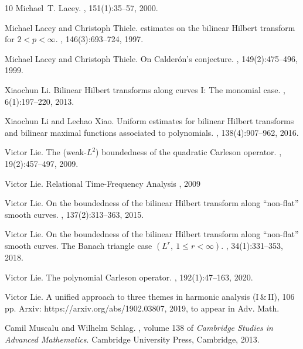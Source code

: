 \documentclass[a4paper,reqno]{amsart}
\numberwithin{equation}{section}
\theoremstyle{definition}
\begin{document}
\begin{thebibliography}{10}
Michael~T. Lacey.
, 151(1):35--57, 2000.

Michael Lacey and Christoph Thiele.
 estimates on the bilinear {H}ilbert transform for
  {$2<p<\infty$}.
, 146(3):693--724, 1997.

Michael Lacey and Christoph Thiele.
\newblock On {C}alder\'{o}n's conjecture.
, 149(2):475--496, 1999.

Xiaochun Li.
\newblock Bilinear {H}ilbert transforms along curves {I}: {T}he monomial case.
, 6(1):197--220, 2013.

Xiaochun Li and Lechao Xiao.
\newblock Uniform estimates for bilinear {H}ilbert transforms and bilinear
  maximal functions associated to polynomials.
, 138(4):907--962, 2016.

Victor Lie.
\newblock The (weak-{$L^2$}) boundedness of the quadratic {C}arleson operator.
, 19(2):457--497, 2009.

Victor Lie.
\newblock Relational Time-Frequency Analysis
, 2009

Victor Lie.
\newblock On the boundedness of the bilinear {H}ilbert transform along
  ``non-flat'' smooth curves.
, 137(2):313--363, 2015.

Victor Lie.
\newblock On the boundedness of the bilinear {H}ilbert transform along
  ``non-flat'' smooth curves. {T}he {B}anach triangle case {$(L^r,\ 1\leq
  r<\infty)$}.
, 34(1):331--353, 2018.

Victor Lie.
\newblock The polynomial {C}arleson operator.
, 192(1):47--163, 2020.

Victor Lie.
\newblock A unified approach to three themes in harmonic analysis
  ({I}$\,\&\,${II}), 106 pp.
\newblock Arxiv: https://arxiv.org/abs/1902.03807, 2019, to appear in Adv. Math.


Camil Muscalu and Wilhelm Schlag.
,
  volume 138 of {\em Cambridge Studies in Advanced Mathematics}.
\newblock Cambridge University Press, Cambridge, 2013.


\end{thebibliography}
\end{document}
